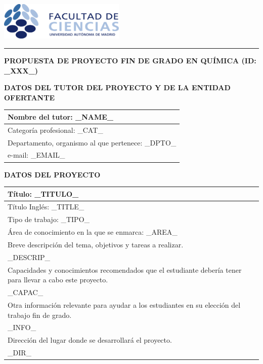 \documentclass[a4paper,10pt]{article}
\begin{document}
\begin{center}
    \includegraphics[width=6cm]{Ciencias_UAM.pdf}

    \rule{\textwidth}{0.2mm}
    \vspace*{0.2cm}
    
    \Large 
	\textbf{PROPUESTA DE PROYECTO FIN DE GRADO EN QUÍMICA (ID: _XXX_)}
\end{center}

\textbf{DATOS DEL TUTOR DEL PROYECTO Y DE LA ENTIDAD OFERTANTE}
\vspace*{0.2cm}

\begin{tabular}{|p{}|}
\hline
Nombre del tutor: _NAME_ \\\hline
Categoría profesional: _CAT_ \\\hline
Departamento, organismo al que pertenece: _DPTO_ \\\hline
e-mail: _EMAIL_ \\\hline
\end{tabular}
\vspace*{0.6cm}


\textbf{DATOS DEL PROYECTO}
\vspace*{0.2cm}

\begin{tabular}{|p{}|}
\hline
Título: _TITULO_ \\\hline
Título Inglés: _TITLE_ \\\hline
Tipo de trabajo: _TIPO_ \\\hline
Área de conocimiento en la que se enmarca: _AREA_ \\\hline
Breve descripción del tema, objetivos y tareas a realizar.\\
_DESCRIP_
\\\hline
Capacidades y conocimientos recomendados que el estudiante debería tener para llevar a cabo este proyecto.\\
_CAPAC_
\\\hline
Otra información relevante para ayudar a los estudiantes en su elección del trabajo fin de grado.\\
_INFO_\\\hline
Dirección del lugar donde se desarrollará el proyecto.\\
_DIR_\\\hline
\end{tabular}
\end{document}
